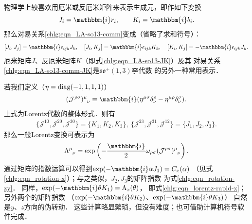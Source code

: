 物理学上较喜欢用厄米或反厄米矩阵来表示生成元，即作如下变换
\begin{equation}\label{chlg:eqn_LA-so13-JK}
    J_i = \mathbbm{i} r_i,\qquad  K_i = \mathbbm{i} b_i .
\end{equation}
那么对易关系\eqref{chlg:eqn_LA-so13-comm}变成（省略了求和符号）：
\begin{equation}\label{chlg:eqn_LA-so13-comm-JK}
    [J_i, J_j] = \mathbbm{i} \epsilon_{ijk} J_k,\quad
    [J_i, K_j] = \mathbbm{i} \epsilon_{ijk} K_k,\quad
    [K_i, K_j] = -\mathbbm{i}\epsilon_{ijk} J_k.
\end{equation}
厄米矩阵$J$、反厄米矩阵$K$（即式\eqref{chlg:eqn_LA-so13-JK}）及其
对易关系\eqref{chlg:eqn_LA-so13-comm-JK}是$\mathfrak{so}^{+}(1,3)$李代数
的另外一种常用表示．


若我们定义（$\eta={\rm diag}(-1,1,1,1)$）
\begin{equation}\label{chlg:eqn_LJw}
    (\mathcal{J}^{\rho\sigma})^\mu_{\hphantom{\mu}\nu} \equiv 
    \mathbbm{i} ( \eta^{\mu\sigma} \delta^\rho_\nu -\eta^{\mu\rho} \delta^\sigma_\nu).
\end{equation}
上式为Lorentz代数的整体形式．则有
\begin{align}
    \{\mathcal{J}^{10},\mathcal{J}^{20},\mathcal{J}^{30} \} =\{K_1,K_2,K_3\}, \
    \{\mathcal{J}^{23},\mathcal{J}^{31},\mathcal{J}^{12} \} =\{J_1,J_2,J_3\}.
\end{align}
那么一般Lorentz变换可表示为
\begin{equation}
    \Lambda^\mu_{\hphantom{\mu}\nu} = \exp\left( -\frac{\mathbbm{i}}{2}\omega_{\rho\sigma}
    (\mathcal{J}^{\rho\sigma})^\mu_{\hphantom{\mu}\nu} \right) .
\end{equation}
通过矩阵的指数运算可以得到$\exp(-\mathbbm{i} \alpha J_1)= C_x(\alpha)$
（见式\eqref{chlg:eqn_rotation-x}）；与之类似，$J_2,J_3$的矩阵指数
为式\eqref{chlg:eqn_rotation-zy}．
同样，$\exp(-\mathbbm{i} \theta K_1)= \Lambda_x(\theta)$，
即式\eqref{chlg:eqn_lorentz-rapid-x}；另外两个的矩阵指数
（$\exp(-\mathbbm{i} \theta K_2)$、$\exp(-\mathbbm{i} \theta K_3)$）
自然是$y$、$z$方向的伪转动．
这些计算略显繁琐，但没有难度；也可借助计算机符号软件完成．


